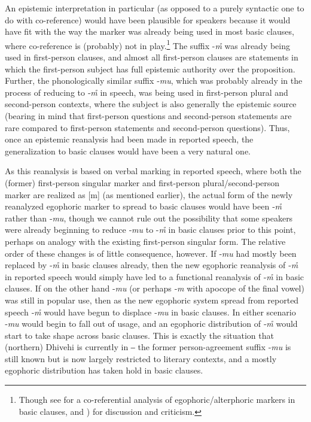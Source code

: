 \documentclass[output=paper]{langsci/langscibook}
\begin{document}
An epistemic interpretation in particular (as opposed to a purely syntactic one to do with co-reference) would have been plausible for speakers because it would have fit with the way the marker was already being used in most basic clauses, where co-reference is (probably) not in play.\footnote{Though see \cite{Hale1980} for a co-referential analysis of egophoric/alterphoric markers in basic clauses, and \cite[51–54]{SanRoque2018}) for discussion and criticism.} 
The suffix -\textit{m̊} was already being used in first-person clauses, and almost all first-person clauses are statements in which the first-person subject has full epistemic authority over the proposition. Further, the phonologically similar suffix ‑\textit{mu}, which was probably already in the process of reducing to ‑\textit{m̊} in speech, was being used in first-person plural and second-person contexts, where the subject is also generally the epistemic source (bearing in mind that first-person questions and second-person statements are rare compared to first-person statements and second-person questions). Thus, once an epistemic reanalysis had been made in reported speech, the generalization to basic clauses would have been a very natural one. 

As this reanalysis is based on verbal marking in reported speech, where both the (former) first-person singular marker and first-person plural/second-person marker are realized as [m] (as mentioned earlier), the actual form of the newly reanalyzed egophoric marker to spread to basic clauses would have been ‑\textit{m̊} rather than ‑\textit{mu}, though we cannot rule out the possibility that some speakers were already beginning to reduce ‑\textit{mu} to -\textit{m̊} in basic clauses prior to this point, perhaps on analogy with the existing first-person singular form. The relative order of these changes is of little consequence, however. If ‑\textit{mu} had mostly been replaced by ‑\textit{m̊} in basic clauses already, then the new egophoric reanalysis of ‑\textit{m̊} in reported speech would simply have led to a functional reanalysis of ‑\textit{m̊} in basic clauses. If on the other hand ‑\textit{mu} (or perhaps ‑\textit{m} with apocope of the final vowel) was still in popular use, then as the new egophoric system spread from reported speech ‑\textit{m̊} would have begun to displace ‑\textit{mu} in basic clauses. In either scenario ‑\textit{mu} would begin to fall out of usage, and an egophoric distribution of ‑\textit{m̊} would start to take shape across basic clauses. This is exactly the situation that (northern) Dhivehi is currently in ‒ the former person-agreement suffix ‑\textit{mu} is still known but is now largely restricted to literary contexts, and a mostly egophoric distribution has taken hold in basic clauses. 
\end{document}
